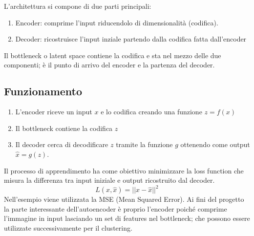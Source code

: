 L'architettura si compone di due parti principali:
\begin{enumerate}
    \item Encoder: comprime l'input riducendolo di dimensionalità (codifica).
    \item Decoder: ricostruisce l'input inziale partendo dalla codifica fatta dall'encoder
\end{enumerate}
Il bottleneck o latent space contiene la codifica e sta nel mezzo delle due componenti; è il punto di arrivo del encoder e la partenza del decoder.

\subsection{Funzionamento}
\begin{enumerate}
    \item L'encoder riceve un input \( x \) e lo codifica creando una funzione \( z= f(x) \)
    \item Il bottleneck contiene la codifica \( z \)
    \item Il decoder cerca di decodificare \( z \) tramite la funzione \( g \) ottenendo come output \( \hat{x} = g(z) \).
\end{enumerate}

Il processo di apprendimento ha come obiettivo minimizzare la loss function che misura la differenza tra input iniziale e output ricostruito dal decoder.
\[ L(x, \hat{x}) = ||x - \hat{x}||^2 \]
Nell'esempio viene utilizzata la MSE (Mean Squared Error).
Ai fini del progetto la parte interessante dell'autoencoder è proprio l'encoder poiché comprime l'immagine in input lasciando un set di features nel bottleneck; che possono essere utilizzate successivamente per il clustering.








